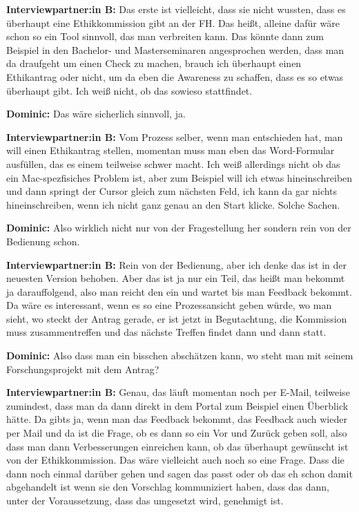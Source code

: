 \documentclass[a4paper,12pt,twoside]{scrreprt}
\begin{document}
\textbf{Interviewpartner:in B:} Das erste ist vielleicht, dass sie nicht wussten, dass es überhaupt eine Ethikkommission gibt an der FH. Das heißt, alleine dafür wäre schon so ein Tool sinnvoll, das man verbreiten kann. Das könnte dann zum Beispiel in den Bachelor- und Masterseminaren angesprochen werden, dass man da draufgeht um einen Check zu machen, brauch ich überhaupt einen Ethikantrag oder nicht, um da eben die Awareness zu schaffen, dass es so etwas überhaupt gibt. Ich weiß nicht, ob das sowieso stattfindet.

\textbf{Dominic:} Das wäre sicherlich sinnvoll, ja.

\textbf{Interviewpartner:in B:} Vom Prozess selber, wenn man entschieden hat, man will einen Ethikantrag stellen, momentan muss man eben das Word-Formular ausfüllen, das es einem teilweise schwer macht. Ich weiß allerdings nicht ob das ein Mac-spezfisiches Problem ist, aber zum Beispiel will ich etwas hineinschreiben und dann springt der Cursor gleich zum nächsten Feld, ich kann da gar nichts hineinschreiben, wenn ich nicht ganz genau an den Start klicke. Solche Sachen.

\textbf{Dominic:} Also wirklich nicht nur von der Fragestellung her sondern rein von der Bedienung schon.

\textbf{Interviewpartner:in B:} Rein von der Bedienung, aber ich denke das ist in der neuesten Version behoben. Aber das ist ja nur ein Teil, das heißt man bekommt ja darauffolgend, also man reicht den ein und wartet bis man Feedback bekommt. Da wäre es interessant, wenn es so eine Prozessansicht geben würde, wo man sieht, wo steckt der Antrag gerade, er ist jetzt in Begutachtung, die Kommission muss zusammentreffen und das nächste Treffen findet dann und dann statt.

\textbf{Dominic:} Also dass man ein bisschen abschätzen kann, wo steht man mit seinem Forschungsprojekt mit dem Antrag?

\textbf{Interviewpartner:in B:} Genau, das läuft momentan noch per E-Mail, teilweise zumindest, dass man da dann direkt in dem Portal zum Beispiel einen Überblick hätte. Da gibts ja, wenn man das Feedback bekommt, das Feedback auch wieder per Mail und da ist die Frage, ob es dann so ein Vor und Zurück geben soll, also dass man dann Verbesserungen einreichen kann, ob das überhaupt gewünscht ist von der Ethikkommission. Das wäre vielleicht auch noch so eine Frage. Dass die dann noch einmal darüber gehen und sagen das passt oder ob das eh schon damit abgehandelt ist wenn sie den Vorschlag kommuniziert haben, dass das dann, unter der Voraussetzung, dass das umgesetzt wird, genehmigt ist.
\end{document}
